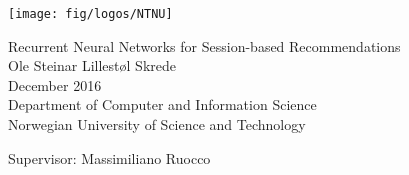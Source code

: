 
\thispagestyle{empty}
\texttt{[image: fig/logos/NTNU]}
\mbox{}\\[6pc]
\begin{center}
\Huge{Recurrent Neural Networks for Session-based Recommendations}\\[2pc]

\Large{Ole Steinar Lillestøl Skrede}\\[1pc]
\large{December 2016}\\[2pc]

Department of Computer and Information Science\\
Norwegian University of Science and Technology
\end{center}
\vfill

\noindent Supervisor: Massimiliano Ruocco

